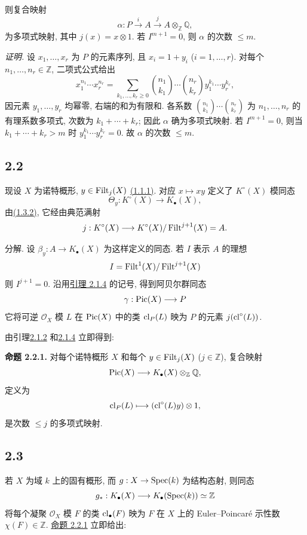则复合映射
\[
\alpha:P\xrightarrow{i}A\xrightarrow{j}A\otimes_{\mathbb Z}\mathbb Q,
\]
为多项式映射, 其中 $j(x)=x\otimes1$. 若 $I^{m+1}=0$, 则 $\alpha$ 的次数 $\leq m$.
%

\emph{证明.} 设 $x_1,\ldots,x_r$ 为 $P$ 的元素序列, 且 $x_i=1+y_i$ ($i=1,\ldots,r$). 对每个 $n_1,\ldots,n_r\in\mathbb Z$, 二项式公式给出
%
%
%
\begin{equation}\tag{2.1.5}
x_1^{n_1}\cdots x_r^{n_r}=
\sum_{k_1,\ldots,k_r\geq0}
\binom{n_1}{k_1}\cdots\binom{n_r}{k_r}
y_1^{k_1}\cdots y_r^{k_r},
\end{equation}
因元素 $y_1,\ldots,y_r$ 均幂零, 右端的和为有限和. 各系数 $\binom{n_1}{k_1}\cdots\binom{n_r}{k_r}$ 为 $n_1,\ldots,n_r$ 的有理系数多项式, 次数为 $k_1+\cdots+k_r$; 因此 $\alpha$ 确为多项式映射. 若 $I^{m+1}=0$, 则当 $k_1+\cdots+k_r>m$ 时 $y_1^{k_1}\cdots y_r^{k_r}=0$. 故 $\alpha$ 的次数 $\leq m$.
%
%
%
%
%
%

\subsection*{2.2} 现设 $X$ 为诺特概形, $y\in\operatorname{Filt}_j(X)$ \hyperlink{sga6.e10.def.1-1-1}{(1.1.1)}. 对应 $x\mapsto xy$ 定义了 $K^\circ(X)$ 模同态
%
%
\[
\Theta_y:K^\circ(X)\longrightarrow K_\bullet(X),
\]
由\hyperlink{sga6.e10.thm.1-3-2}{(1.3.2)}, 它经由典范满射
\[
j:K^\circ(X)\longrightarrow
K^\circ(X)/\operatorname{Filt}^{j+1}(X)=A.
\]

分解. 设 $\beta_y:A\to K_\bullet(X)$ 为这样定义的同态. 若 $I$ 表示 $A$ 的理想
%
\[
I=\operatorname{Filt}^1(X)/\operatorname{Filt}^{j+1}(X)
\]
则 $I^{j+1}=0$. 沿用\hyperlink{sga6.e10.lem.2-1-4}{引理 2.1.4} 的记号, 得到阿贝尔群同态
%
\[
\gamma:\operatorname{Pic}(X)\longrightarrow P
\]
它将可逆 $\mathcal O_X$ 模 $L$ 在 $\operatorname{Pic}(X)$ 中的类 $\operatorname{cl}_P(L)$ 映为 $P$ 的元素 $j(\operatorname{cl}^\circ(L))$.
%

由引理\hyperlink{sga6.e10.lem.2-1-2}{2.1.2} 和\hyperlink{sga6.e10.lem.2-1-4}{2.1.4} 立即得到:

\textbf{命题 2.2.1.} 对每个诺特概形 $X$ 和每个 $y\in\operatorname{Filt}_j(X)$ ($j\in\mathbb Z$), 复合映射
%
%
\[
\operatorname{Pic}(X)\longrightarrow K_\bullet(X)\otimes_{\mathbb Z}\mathbb Q,
\]
定义为
\[
\operatorname{cl}_P(L)\longmapsto(\operatorname{cl}^\circ(L)y)\otimes1,
\]
是次数 $\leq j$ 的多项式映射.

\subsection*{2.3} 若 $X$ 为域 $k$ 上的固有概形, 而 $g:X\to\operatorname{Spec}(k)$ 为结构态射, 则同态
%
%
\[
g_*:K_\bullet(X)\longrightarrow K_\bullet(\operatorname{Spec}(k))\simeq\mathbb Z
\]
将每个凝聚 $\mathcal O_X$ 模 $F$ 的类 $\operatorname{cl}_\bullet(F)$ 映为 $F$ 在 $X$ 上的 Euler--Poincar\'e 示性数 $\chi(F)\in\mathbb Z$. \hyperlink{sga6.e10.prop.2-2-1}{命题 2.2.1} 立即给出:
%
%

